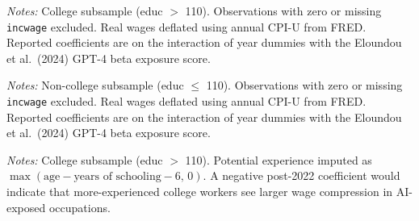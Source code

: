 \documentclass[11pt]{article}
\begin{document}
\begin{table}[H]
\begin{center}
\caption{Log Wage Table A --- college subsample. Dependent variable: log annual real wages (1982 dollars). Columns (1)--(3): no fixed effects, sex FE, sex + education FE. Year 2022 is the omitted baseline. Standard errors clustered at the occupation level. $^{*}p<0.10$, $^{**}p<0.05$, $^{***}p<0.01$.}
\label{tab:lw_A_col}
\resizebox{0.9\textwidth}{!}{}
\end{center}
\smallskip
\noindent\footnotesize\textit{Notes:} College subsample (educ $>$ 110). Observations with zero or missing \texttt{incwage} excluded. Real wages deflated using annual CPI-U from FRED. Reported coefficients are on the interaction of year dummies with the Eloundou et al.\ (2024) GPT-4 beta exposure score.
\end{table}

\begin{table}[H]
\begin{center}
\caption{Log Wage Table A --- non-college subsample. Dependent variable: log annual real wages (1982 dollars). Columns (1)--(3): no fixed effects, sex FE, sex + education FE. Year 2022 is the omitted baseline. Standard errors clustered at the occupation level. $^{*}p<0.10$, $^{**}p<0.05$, $^{***}p<0.01$.}
\label{tab:lw_A_noncol}
\resizebox{0.9\textwidth}{!}{}
\end{center}
\smallskip
\noindent\footnotesize\textit{Notes:} Non-college subsample (educ $\leq$ 110). Observations with zero or missing \texttt{incwage} excluded. Real wages deflated using annual CPI-U from FRED. Reported coefficients are on the interaction of year dummies with the Eloundou et al.\ (2024) GPT-4 beta exposure score.
\end{table}

\begin{table}[H]
\begin{center}
\caption{Log Wage Table B --- college subsample. Dependent variable: log annual real wages. Reported coefficients are on the triple interaction year $\times$ potential experience $\times$ AI exposure. Columns (1)--(3): no fixed effects, sex FE, sex + education FE. Standard errors clustered at the occupation level. $^{*}p<0.10$, $^{**}p<0.05$, $^{***}p<0.01$.}
\label{tab:lw_B_col}
\resizebox{0.9\textwidth}{!}{}
\end{center}
\smallskip
\noindent\footnotesize\textit{Notes:} College subsample (educ $>$ 110). Potential experience imputed as $\max(\text{age} - \text{years of schooling} - 6,\, 0)$. A negative post-2022 coefficient would indicate that more-experienced college workers see larger wage compression in AI-exposed occupations.
\end{table}
\end{document}
